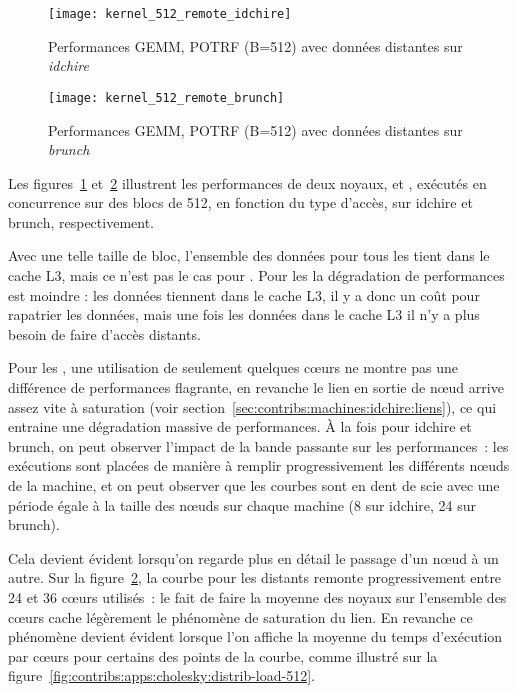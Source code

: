 \begin{figure}[t!]
  \centering
  \texttt{[image: kernel\_512\_remote\_idchire]}
  \caption{Performances GEMM, POTRF (B=512) avec données distantes sur \emph{idchire}}\label{fig:contribs:apps:cholesky:perf-512-remote-idchire}
\end{figure}
\begin{figure}[h!]
  \centering
  \texttt{[image: kernel\_512\_remote\_brunch]}
  \caption{Performances GEMM, POTRF (B=512) avec données distantes sur \emph{brunch}}\label{fig:contribs:apps:cholesky:perf-512-remote-brunch}
\end{figure}

Les figures~\ref{fig:contribs:apps:cholesky:perf-512-remote-idchire} et~\ref{fig:contribs:apps:cholesky:perf-512-remote-brunch} illustrent les performances de deux noyaux, \gemm et \potrf, exécutés en concurrence sur des blocs de 512, en fonction du type d'accès, sur idchire et brunch, respectivement.

Avec une telle taille de bloc, l'ensemble des données pour tous les \potrf tient dans le cache L3, mais ce n'est pas le cas pour \gemm.
Pour les \potrf la dégradation de performances est moindre : les données tiennent dans le cache L3, il y a donc un coût pour rapatrier les données, mais une fois les données dans le cache L3 il n'y a plus besoin de faire d'accès distants.

Pour les \gemm, une utilisation de seulement quelques cœurs ne montre pas une différence de performances flagrante, en revanche le lien en sortie de nœud arrive assez vite à saturation (voir section~\ref{sec:contribs:machines:idchire:liens}), ce qui entraine une dégradation massive de performances.
À la fois pour idchire et brunch, on peut observer l'impact de la bande passante sur les performances~: les exécutions sont placées de manière à remplir progressivement les différents nœuds de la machine, et on peut observer que les courbes sont en dent de scie avec une période égale à la taille des nœuds sur chaque machine (8 sur idchire, 24 sur brunch).

Cela devient évident lorsqu'on regarde plus en détail le passage d'un nœud à un autre.
Sur la figure~\ref{fig:contribs:apps:cholesky:perf-512-remote-brunch}, la courbe pour les \gemm distants remonte progressivement entre 24 et 36 cœurs utilisés~: le fait de faire la moyenne des noyaux sur l'ensemble des cœurs cache légèrement le phénomène de saturation du lien.
En revanche ce phénomène devient évident lorsque l'on affiche la moyenne du temps d'exécution par cœurs pour certains des points de la courbe, comme illustré sur la figure~\ref{fig:contribs:apps:cholesky:distrib-load-512}.

